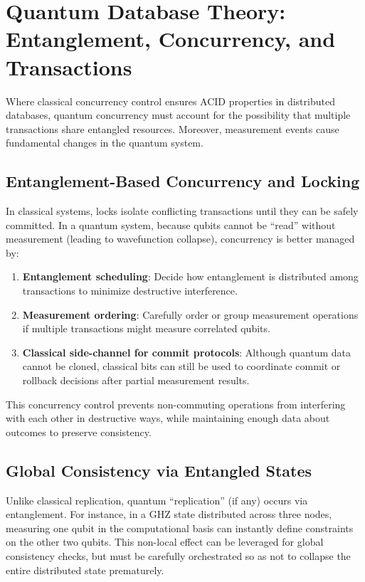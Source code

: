 \documentclass[11pt]{article}
\begin{document}
\section{Quantum Database Theory: Entanglement, Concurrency, and Transactions}
\label{sec:qdb_theory}
Where classical concurrency control ensures ACID properties in distributed databases, quantum concurrency must account for the possibility that multiple transactions share entangled resources. Moreover, measurement events cause fundamental changes in the quantum system.

\subsection{Entanglement-Based Concurrency and Locking}
In classical systems, locks isolate conflicting transactions until they can be safely committed. In a quantum system, because qubits cannot be “read” without measurement (leading to wavefunction collapse), concurrency is better managed by:

\begin{enumerate}
    \item \textbf{Entanglement scheduling}: Decide how entanglement is distributed among transactions to minimize destructive interference.
    \item \textbf{Measurement ordering}: Carefully order or group measurement operations if multiple transactions might measure correlated qubits. 
    \item \textbf{Classical side-channel for commit protocols}: Although quantum data cannot be cloned, classical bits can still be used to coordinate commit or rollback decisions after partial measurement results.
\end{enumerate}

This concurrency control prevents non-commuting operations from interfering with each other in destructive ways, while maintaining enough data about outcomes to preserve consistency.

\subsection{Global Consistency via Entangled States}
Unlike classical replication, quantum “replication” (if any) occurs via entanglement. For instance, in a GHZ state distributed across three nodes, measuring one qubit in the computational basis can instantly define constraints on the other two qubits. This non-local effect can be leveraged for global consistency checks, but must be carefully orchestrated so as not to collapse the entire distributed state prematurely.
\end{document}
